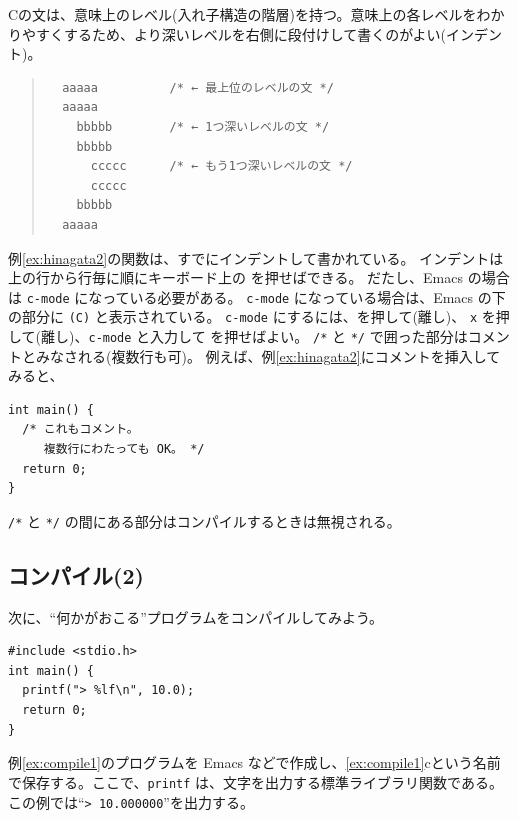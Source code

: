 Cの文は、意味上のレベル(入れ子構造の階層)を持つ。意味上の各レベルをわかりやすくするため、より深いレベルを右側に段付けして書くのがよい(インデント)。
%
\begin{quote}
\begin{verbatim}
  aaaaa          /* ← 最上位のレベルの文 */
  aaaaa
    bbbbb        /* ← 1つ深いレベルの文 */
    bbbbb
      ccccc      /* ← もう1つ深いレベルの文 */
      ccccc
    bbbbb
  aaaaa
\end{verbatim}
\end{quote}
%
例\ref{ex:hinagata2}の関数は、すでにインデントして書かれている。
%
インデントは上の行から行毎に順にキーボード上の \tabkey を押せばできる。
だたし、Emacs の場合は \verb+c-mode+ になっている必要がある。
\verb+c-mode+ になっている場合は、Emacs の下の部分に \verb+(C)+ と表示されている。
\verb+c-mode+ にするには、\esckey を押して(離し)、
\verb+x+ を押して(離し)、\verb+c-mode+ と入力して \ret を押せばよい。
\verb+/*+ と \verb+*/+ で囲った部分はコメントとみなされる(複数行も可)。
例えば、例\ref{ex:hinagata2}にコメントを挿入してみると、
\begin{reidai}
\begin{verbatim}
int main() {
  /* これもコメント。
     複数行にわたっても OK。 */
  return 0;
}
\end{verbatim}
\end{reidai} \noindent
%
\verb+/*+ と \verb+*/+ の間にある部分はコンパイルするときは無視される。

\subsection{コンパイル(2)}
次に、``何かがおこる''プログラムをコンパイルしてみよう。
%
\begin{reidai}\label{ex:compile1}
\begin{verbatim}
#include <stdio.h>
int main() {
  printf("> %lf\n", 10.0);
  return 0;
}
\end{verbatim}
\end{reidai} \noindent
%
例\ref{ex:compile1}のプログラムを Emacs などで作成し、\ref{ex:compile1}cという名前で保存する。ここで、\verb+printf+ は、文字を出力する標準ライブラリ関数である。この例では``\verb+> 10.000000+''を出力する。

